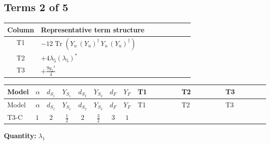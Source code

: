 \documentclass[8pt]{article}
\begin{document}
\begin{landscape}
\subsection*{Terms 2 of 5}
\begin{center}
\begin{tabular}{@{}c >{\raggedright\arraybackslash}p{0.82\linewidth}@{}}
\toprule
Column & Representative term structure \\
\midrule
T1 & \(\displaystyle -12 \operatorname{Tr}\!\left({Y_u}\,\left({Y_u}\right)^{\dagger}\,{Y_u}\,\left({Y_u}\right)^{\dagger}\right)\) \\
\midrule
T2 & \(\displaystyle +4 {\lambda_5} \left({\lambda_5}\right)^{*}\) \\
\midrule
T3 & \(\displaystyle +\frac{9 {g_2}^4}{4}\) \\
\midrule
\bottomrule
\end{tabular}
\end{center}
\smallskip
\tiny
\begin{longtable}{@{}llcccccc >{\raggedright\arraybackslash}p{0.21\linewidth} >{\raggedright\arraybackslash}p{0.21\linewidth} >{\raggedright\arraybackslash}p{0.21\linewidth}@{}}
\toprule
Model & $\alpha$ & $d_{S_1}$ & $Y_{S_1}$ & $d_{S_2}$ & $Y_{S_2}$ & $d_F$ & $Y_F$ & T1 & T2 & T3 \\
\midrule
\endfirsthead
\toprule
Model & $\alpha$ & $d_{S_1}$ & $Y_{S_1}$ & $d_{S_2}$ & $Y_{S_2}$ & $d_F$ & $Y_F$ & T1 & T2 & T3 \\
\midrule
\endhead
T3-C & $1$ & $2$ & $\frac{1}{2}$ & $2$ & $\frac{3}{2}$ & $3$ & $1$ & \scriptsize\adjustbox{max width=\linewidth}{$\begin{gathered} -12 \operatorname{Tr}\!\left({Y_u}\,\left({Y_u}\right)^{\dagger}\,{Y_u}\,\left({Y_u}\right)^{\dagger}\right)\end{gathered}$} & \scriptsize\adjustbox{max width=\linewidth}{$\begin{gathered} +4 {\lambda_5} \left({\lambda_5}\right)^{*}\end{gathered}$} & \scriptsize\adjustbox{max width=\linewidth}{$\begin{gathered} +\frac{9 {g_2}^4}{4}\end{gathered}$} \\
\midrule
\bottomrule
\end{longtable}
\clearpage
\noindent\textbf{Quantity: }$\lambda_1$\par\smallskip

\end{landscape}
\end{document}
